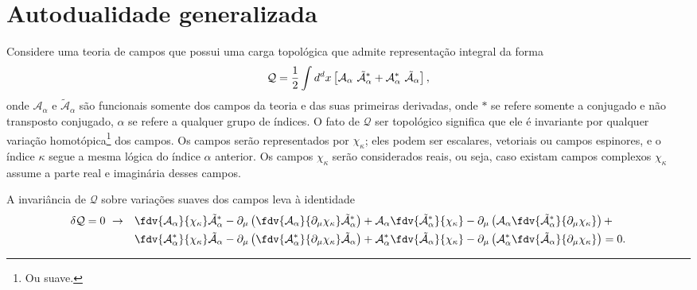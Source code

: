 \chapter[Autodualidade generalizada]{Autodualidade generalizada}
\label{autodulidade generalizada}

Considere uma teoria de campos que possui uma carga topológica que admite representação integral da forma
\begin{equation}
    \centering
    \mathcal{Q} = \dfrac{1}{2} \int d^{d}x \left [ \mathcal{A}_\alpha \ \tilde{\mathcal{A}}_\alpha^* + \mathcal{A}_\alpha^* \ \tilde{\mathcal{A}}_\alpha \right],
    \label{cargatop}
\end{equation}
onde $\mathcal{A}_\alpha$ e $\tilde{\mathcal{A}}_\alpha$ são funcionais somente dos campos da teoria e das suas primeiras derivadas, onde $*$ se refere somente a conjugado e não transposto conjugado, $\alpha$ se refere a qualquer grupo de índices. O fato de $\mathcal{Q}$ ser topológico significa que ele é invariante por qualquer variação homotópica\footnote{Ou suave.} dos campos. Os campos serão representados por $\chi_\kappa$; eles podem ser escalares, vetoriais ou campos espinores, e o índice $\kappa$ segue a mesma lógica do índice $\alpha$ anterior. Os campos $\chi_\kappa$ serão considerados reais, ou seja, caso existam campos complexos $\chi_\kappa$ assume a parte real e imaginária desses campos.

A invariância de $\mathcal{Q}$ sobre variações suaves dos campos leva à identidade
\begin{equation}
\begin{split}
    \delta\mathcal{Q} = 0 \ \rightarrow \ \ \ &\fdv{\mathcal{A}_\alpha}{\chi_\kappa}\tilde{\mathcal{A}}_\alpha^* - \partial_\mu \left(\fdv{\mathcal{A}_\alpha}{\partial_\mu\chi_\kappa}\tilde{\mathcal{A}}_\alpha^* \right) + \mathcal{A}_\alpha\fdv{\tilde{\mathcal{A}}_\alpha^*}{\chi_\kappa} - \partial_\mu \left( \mathcal{A}_\alpha\fdv{\tilde{\mathcal{A}}_\alpha^*}{\partial_\mu\chi_\kappa} \right) +\\
    & \fdv{\mathcal{A}_\alpha^*}{\chi_\kappa}\tilde{\mathcal{A}}_\alpha - \partial_\mu \left(\fdv{\mathcal{A}_\alpha^*}{\partial_\mu\chi_\kappa}\tilde{\mathcal{A}}_\alpha \right) + \mathcal{A}_\alpha^*\fdv{\tilde{\mathcal{A}}_\alpha}{\chi_\kappa} - \partial_\mu \left( \mathcal{A}_\alpha^*\fdv{\tilde{\mathcal{A}}_\alpha}{\partial_\mu\chi_\kappa} \right) = 0.
\end{split}
\label{identQ}
\end{equation}

